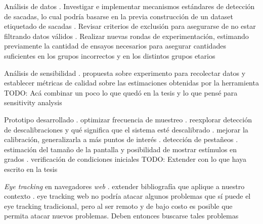 \documentclass[aspectratio=169]{beamer}
\begin{document}
\begin{frame}{Análisis de datos}
. Investigar e implementar mecanismos estándares de detección de sacadas, lo
  cual podría basarse en la previa construcción de un dataset etiquetado de
  sacadas
. Revisar criterios de exclusión para asegurarse de no estar filtrando datos
  válidos
. Realizar nuevas rondas de experimentación, estimando previamente la cantidad
  de ensayos necesarios para asegurar cantidades suficientes en los grupos
  incorrectos y en los distintos grupos etarios
\end{frame}

\begin{frame}{Análisis de sensibilidad}
. propuesta sobre experimento para recolectar datos y establecer métricas de
  calidad sobre las estimaciones obtenidas por la herramienta
TODO: Acá combinar un poco lo que quedó en la tesis y lo que pensé para
      sensitivity analysis
\end{frame}

\begin{frame}{Prototipo desarrollado}
. optimizar frecuencia de muestreo
. reexplorar detección de descalibraciones y qué significa que el sistema esté
  descalibrado
. mejorar la calibración, generalizarla a más puntos de interés
. detección de pestañeos
. estimación del tamaño de la pantalla y posibilidad de mostrar estímulos en
  grados
. verificación de condiciones iniciales
TODO: Extender con lo que haya escrito en la tesis
\end{frame}

\begin{frame}{\textit{Eye tracking} en navegadores \textit{web}}
. extender bibliografía que aplique a nuestro contexto
. eye tracking web no podría atacar algunos problemas que sí puede el eye
  tracking tradicional, pero al ser remoto y de bajo costo es posible que
  permita atacar nuevos problemas. Deben entonces buscarse tales problemas
\end{frame}
\end{document}
